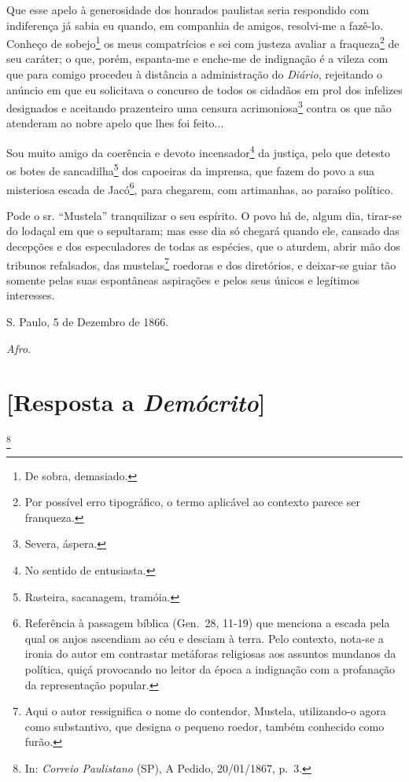 Que esse apelo à generosidade dos honrados paulistas seria respondido
com indiferença já sabia eu quando, em companhia de amigos, resolvi-me a
fazê-lo. Conheço de sobejo\footnote{De sobra, demasiado.} os meus
compatrícios e sei com justeza avaliar a fraqueza\footnote{Por
  possível erro tipográfico, o termo aplicável ao contexto parece ser
  franqueza.} de seu caráter; o que, porém, espanta-me e enche-me de
indignação é a vileza com que para comigo procedeu à distância a
administração do \emph{Diário}, rejeitando o anúncio em que eu
solicitava o concurso de todos os cidadãos em prol dos infelizes
designados e aceitando prazenteiro uma censura acrimoniosa\footnote{
  Severa, áspera.} contra os que não atenderam ao nobre apelo que lhes
foi feito...

Sou muito amigo da coerência e devoto incensador\footnote{No sentido
  de entusiasta.} da justiça, pelo que detesto os botes de
sancadilha\footnote{Rasteira, sacanagem, tramóia.} dos capoeiras da
imprensa, que fazem do povo a sua misteriosa escada de Jacó\footnote{
  Referência à passagem bíblica (Gen.~28, 11-19) que menciona a escada
  pela qual os anjos ascendiam ao céu e desciam à terra. Pelo contexto,
  nota-se a ironia do autor em contrastar metáforas religiosas aos
  assuntos mundanos da política, quiçá provocando no leitor da época a
  indignação com a profanação da representação popular.}, para chegarem,
com artimanhas, ao paraíso político.

Pode o sr. ``Mustela'' tranquilizar o seu espírito. O povo há de, algum
dia, tirar-se do lodaçal em que o sepultaram; mas esse dia só chegará
quando ele, cansado das decepções e dos especuladores de todas as
espécies, que o aturdem, abrir mão dos tribunos refalsados, das
mustelas\footnote{Aqui o autor ressignifica o nome do contendor,
  Mustela, utilizando-o agora como substantivo, que designa o pequeno
  roedor, também conhecido como furão.} roedoras e dos diretórios, e
deixar-se guiar tão somente pelas suas espontâneas aspirações e pelos
seus únicos e legítimos interesses.

S. Paulo, 5 de Dezembro de 1866.

\emph{Afro}.

\chapter{{[}Resposta a \emph{Demócrito}{]}}\footnote{In: \emph{Correio
  Paulistano} (SP), A Pedido, 20/01/1867, p.~3.}

